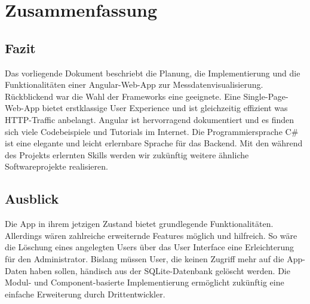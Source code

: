 \chapter{Zusammenfassung}\label{ch:zusammenfassung} 

\section{Fazit}

Das vorliegende Dokument beschriebt die Planung, die Implementierung und die Funktionalitäten einer Angular-Web-App zur Messdatenvisualisierung. Rückblickend war die Wahl der Frameworks eine geeignete. Eine Single-Page-Web-App bietet erstklassige User Experience und ist gleichzeitig effizient was HTTP-Traffic anbelangt. Angular ist hervorragend dokumentiert und es finden sich viele Codebeispiele und Tutorials im Internet. Die Programmiersprache C\# ist eine elegante und leicht erlernbare Sprache für das Backend. Mit den während des Projekts erlernten Skills werden wir zukünftig weitere ähnliche Softwareprojekte realisieren.

\section{Ausblick}

Die App in ihrem jetzigen Zustand bietet grundlegende Funktionalitäten. Allerdings wären zahlreiche erweiternde Features möglich und hilfreich. So wäre die Löschung eines angelegten Users über das User Interface eine Erleichterung für den Administrator. Bislang müssen User, die keinen Zugriff mehr auf die App-Daten haben sollen, händisch aus der SQLite-Datenbank gelöscht werden. Die Modul- und Component-basierte Implementierung ermöglicht zukünftig eine einfache Erweiterung durch Drittentwickler. 
